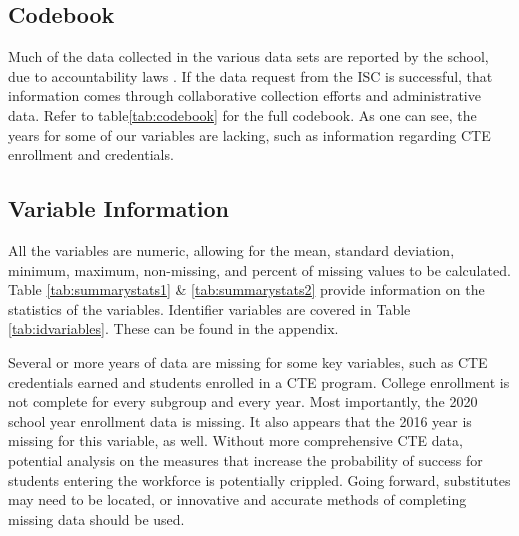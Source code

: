\subsection{Codebook}
Much of the data collected in the various data sets are reported by the school, due to accountability laws \parencite[][]{NCDPI}. 
If the data request from the ISC is successful, that information comes through collaborative collection efforts and administrative data. Refer to table\ref{tab:codebook} for the full codebook. As one can see, the years for some of our variables are lacking, such as information regarding CTE enrollment and credentials.

\subsection{Variable Information}
All the variables are numeric, allowing for the mean, standard deviation, minimum, maximum, non-missing, and percent of missing values to be calculated. Table \ref{tab:summarystats1} \& \ref{tab:summarystats2}  provide information on the statistics of the variables. Identifier variables are covered in Table \ref{tab:idvariables}. These can be found in the appendix.

Several or more years of data are missing for some key variables, such as CTE credentials earned and students enrolled in a CTE program. 
College enrollment is not complete for every subgroup and every year. Most importantly, the 2020 school year enrollment data is missing. 
It also appears that the 2016 year is missing for this variable, as well. Without more comprehensive CTE data, potential analysis on the measures that increase the probability of success for students entering the workforce is potentially crippled. 
Going forward, substitutes may need to be located, or innovative and accurate methods of completing missing data should be used. 